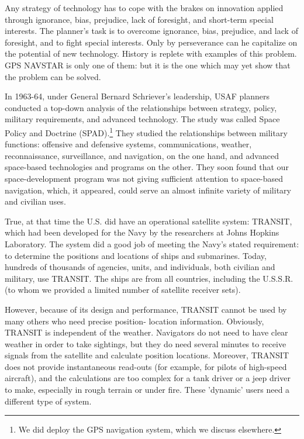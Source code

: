 Any strategy of technology has to cope with the brakes on innovation applied through ignorance, bias, prejudice, lack of foresight, and short-term special interests. The planner's task is to overcome ignorance, bias, prejudice, and lack of foresight, and to fight special interests. Only by perseverance can he capitalize on the potential of new technology. History is replete with examples of this problem. GPS NAVSTAR is only one of them: but it is the one which may yet show that the problem can be solved.

In 1963-64, under General Bernard Schriever's leadership, USAF planners conducted a top-down analysis of the relationships between strategy, policy, military requirements, and advanced technology. The study was called Space Policy and Doctrine (SPAD).\footnote{We did deploy the GPS navigation system, which we discuss elsewhere.} They studied the relationships between military functions: offensive and defensive systems, communications, weather, reconnaissance, surveillance, and navigation, on the one hand, and advanced space-based technologies and programs on the other. They soon found that our space-development program was not giving sufficient attention to space-based navigation, which, it appeared, could serve an almost infinite variety of military and civilian uses.

True, at that time the U.S. did have an operational satellite system: TRANSIT, which had been developed for the Navy by the researchers at Johns Hopkins Laboratory. The system did a good job of meeting the Navy's stated requirement: to determine the positions and locations of ships and submarines. Today, hundreds of thousands of agencies, units, and individuals, both civilian and military, use TRANSIT. The ships are from all countries, including the U.S.S.R. (to whom we provided a limited number of satellite receiver sets).

However, because of its design and performance, TRANSIT cannot be used by many others who need precise position- location information. Obviously, TRANSIT is independent of the weather. Navigators do not need to have clear weather in order to take sightings, but they do need several minutes to receive signals from the satellite and calculate position locations. Moreover, TRANSIT does not provide instantaneous read-outs (for example, for pilots of high-speed aircraft), and the calculations are too complex for a tank driver or a jeep driver to make, especially in rough terrain or under fire. These 'dynamic' users need a different type of system.

